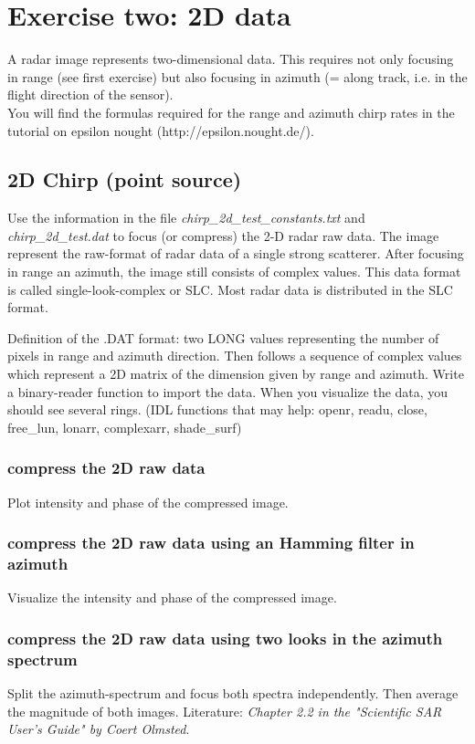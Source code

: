 \newpage
\section{Exercise two: 2D data}
A radar image represents two-dimensional data. This requires not only focusing in range (see first exercise) but also focusing in azimuth (= along track, i.e. in the flight direction of the sensor). \\

You will find the formulas required for the range and azimuth chirp rates in the tutorial on epsilon nought (http://epsilon.nought.de/).

\subsection{2D Chirp (point source)}
Use the information in the file \textit{chirp\_2d\_test\_constants.txt} and \textit{chirp\_2d\_test.dat} to focus (or compress) the 2-D radar raw data. The image represent the raw-format of radar data of a single strong scatterer. After focusing in range an azimuth, the image still consists of complex values. This data format is called single-look-complex or SLC. Most radar data is distributed in the SLC format.

Definition of the .DAT format: two LONG values representing the number of pixels in range and azimuth direction. Then follows a sequence of complex values which represent a 2D matrix of the dimension given by range and azimuth. Write a binary-reader function to import the data. When you visualize the data, you should see several rings.
(IDL functions that may help: openr, readu, close, free\_lun, lonarr, complexarr, shade\_surf)

\subsubsection{compress the 2D raw data}
Plot intensity and phase of the compressed image. 
\subsubsection{compress the 2D raw data using an Hamming filter in azimuth}
Visualize the intensity and phase of the compressed image. 
\subsubsection{compress the 2D raw data using two looks in the azimuth spectrum}
Split the azimuth-spectrum and focus both spectra independently. Then average the magnitude of both images.
Literature: \textit{Chapter 2.2 in the "Scientific SAR User's Guide" by Coert Olmsted}.


